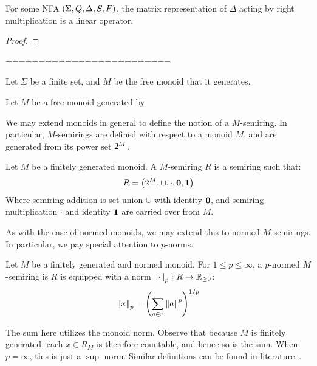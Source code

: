 \documentclass[12pt]{article}
\begin{document}
\begin{theorem}
  For some NFA \(\left(\Sigma, Q, \Delta, S, F\right)\),
  the matrix representation of \(\Delta\)
  acting by right multiplication
  is a linear operator.
\end{theorem}
\begin{proof}
\end{proof}




=========================

\begin{definition}[\(M\)-Semiring]
  Let \(\Sigma\) be a finite set,
  and \(M\) be the free monoid that it generates.


  Let \(M\) be a free monoid generated by 
\end{definition}


We may extend monoids in general to define the notion of a \(M\)-semiring.
In particular,
\(M\)-semirings are defined with respect to a monoid \(M\),
and are generated from its power set \(2^{M}\).

\begin{definition}[\(M\)-Semiring]
  Let \(M\) be a finitely generated monoid.
  A \(M\)-semiring \(R\) is a semiring such that:
  \begin{align*}
    R = \left(2^{M}, \cup, \cdot, \mathbf{0}, \mathbf{1}\right)
  \end{align*}
  Where semiring addition is set union \(\cup\) with identity \(\mathbf{0}\),
  and semiring multiplication \(\cdot\) and identity \(\mathbf{1}\)
  are carried over from \(M\).
\end{definition}

As with the case of normed monoids,
we may extend this to normed \(M\)-semirings.
In particular, we pay special attention to \(p\)-norms.

\begin{definition}
  Let \(M\) be a finitely generated and normed monoid.
  For \(1 \leq p \leq \infty\),
  a \(p\)-normed \(M\)-semiring is \(R\)
  is equipped with a norm \(\left\lVert\cdot\right\rVert_p \colon R \to \mathbb{R}_{\geq 0}\):
  \begin{align*}
    \left\lVert x\right\rVert_{p} = \left(\sum_{a \in x} \left\lVert a\right\rVert ^p\right)^{1/p}
  \end{align*}
\end{definition}

The sum here utilizes the monoid norm.
Observe that because \(M\) is finitely generated,
each \(x \in R_M\) is therefore countable,
and hence so is the sum.
When \(p = \infty\), this is just a \(\sup\) norm.
Similar definitions can be found in literature~\cite{kudlek2000lemmata}.
\end{document}
